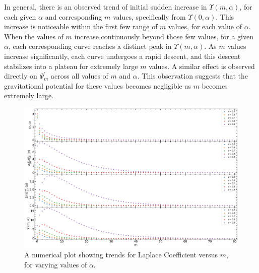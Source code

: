 \documentclass{article}
\begin{document}

In general, there is an observed trend of initial sudden increase in $\Upsilon(m,\alpha)$, for each given $\alpha$ and corresponding $m$ values, specifically from $\Upsilon(0,\alpha)$. This increase is noticeable within the first few range of $m$ values, for each value of $\alpha$. When the values of $m$ increase continuously beyond those few values, for a given $\alpha$, each corresponding curve reaches a distinct peak in $\Upsilon(m,\alpha)$. As $m$ values increase significantly, each curve undergoes a rapid descent, and this descent stabilizes into a plateau for extremely large $m$ values. A similar effect is observed directly on $\Psi_{m}^{'}$ across all values of $m$ and $\alpha$. This observation suggests that the gravitational potential for these values becomes negligible as $m$ becomes extremely large.

\begin{figure}
    \centering
    \includegraphics[width=1\linewidth]{all_plots_versus_m_laplacecoefficients.png}
    \caption{A numerical plot showing trends for Laplace Coefficient versus $m$, for varying values of $\alpha$.}
    \label{fig:enter-label}
\end{figure}
\end{document}
